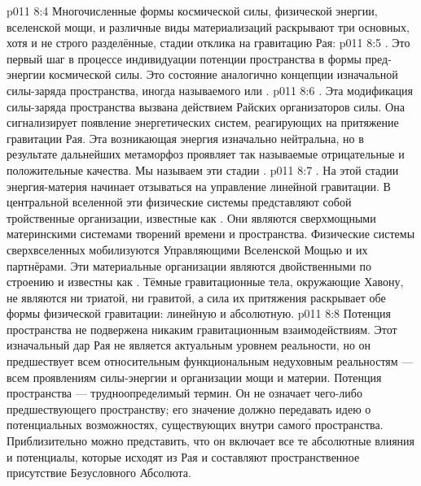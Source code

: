 \vs p011 8:4 \pc Многочисленные формы космической силы, физической энергии, вселенской мощи, и различные виды материализаций раскрывают три основных, хотя и не строго разделённые, стадии отклика на гравитацию Рая:
\vs p011 8:5 . Это первый шаг в процессе индивидуации потенции пространства в формы пред\hyp{}энергии космической силы. Это состояние аналогично концепции изначальной силы\hyp{}заряда пространства, иногда называемого  или .
\vs p011 8:6 . Эта модификация силы\hyp{}заряда пространства вызвана действием Райских организаторов силы. Она сигнализирует появление энергетических систем, реагирующих на притяжение гравитации Рая. Эта возникающая энергия изначально нейтральна, но в результате дальнейших метаморфоз проявляет так называемые отрицательные и положительные качества. Мы называем эти стадии .
\vs p011 8:7 . На этой стадии энергия\hyp{}материя начинает отзываться на управление линейной гравитации. В центральной вселенной эти физические системы представляют собой тройственные организации, известные как . Они являются сверхмощными материнскими системами творений времени и пространства. Физические системы сверхвселенных мобилизуются Управляющими Вселенской Мощью и их партнёрами. Эти материальные организации являются двойственными по строению и известны как . Тёмные гравитационные тела, окружающие Хавону, не являются ни триатой, ни гравитой, а сила их притяжения раскрывает обе формы физической гравитации: линейную и абсолютную.
\vs p011 8:8 \pc Потенция пространства не подвержена никаким гравитационным взаимодействиям. Этот изначальный дар Рая не является актуальным уровнем реальности, но он предшествует всем относительным функциональным недуховным реальностям --- всем проявлениям силы\hyp{}энергии и организации мощи и материи. Потенция пространства --- трудноопределимый термин. Он не означает чего\hyp{}либо предшествующего пространству; его значение должно передавать идею о потенциальных возможностях, существующих внутри самог\'о пространства. Приблизительно можно представить, что он включает все те абсолютные влияния и потенциалы, которые исходят из Рая и составляют пространственное присутствие Безусловного Абсолюта.
